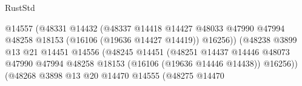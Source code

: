 \begin{lexlean}{RustStd}
\begin{coremodule}
                                                        @14557
                                                        (@48331
                                                          @14432
                                                          (@48337
                                                            @14418
                                                            @14427
                                                            @48033
                                                            @47990
                                                            @47994
                                                            @48258
                                                            @18153
                                                            (@16106 (@19636 @14427 @14419))
                                                            @16256))
                                                        (@48238
                                                          @3899
                                                          @13
                                                          @21
                                                          @14451
                                                          @14556
                                                          (@48245
                                                            @14451
                                                            (@48251
                                                              @14437
                                                              @14446
                                                              @48073
                                                              @47990
                                                              @47994
                                                              @48258
                                                              @18153
                                                              (@16106 (@19636 @14446 @14438))
                                                              @16256))
                                                          (@48268
                                                            @3898
                                                            @13
                                                            @20
                                                            @14470
                                                            @14555
                                                            (@48275
                                                              @14470

\end{coremodule}
\end{lexlean}
